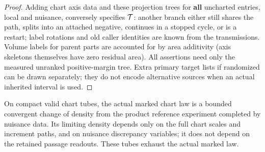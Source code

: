 \begin{proof}
Adding chart
axis data and these projection trees for \textbf{all} uncharted entries, local and nuisance, conversely
specifies \({\cal T}\): another branch either still shares the path, splits into an attached negative,
continues in a stopped cycle, or is a restart; label rotations and old caller identities are known from the
transmissions. Volume labels for parent parts are accounted for by area additivity (axis skeletons
themselves have zero residual area). All assertions need only the measured unranked positive-margin tree.
Extra primary target lists if randomized can be drawn separately; they do not encode alternative sources
when an actual inherited interval is used.

\end{proof}

\begin{lemma}\label{kern:chart-density}
On compact valid chart tubes, the actual marked chart law is a bounded convergent change of
density from the product reference experiment completed by nuisance data. Its limiting density
depends only on the full chart scales and increment paths, and on nuisance discrepancy variables;
it does not depend on the retained passage readouts. These tubes exhaust the actual marked law.
\end{lemma}

